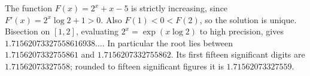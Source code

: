 The function $F(x)=2^x+x-5$ is strictly increasing, since $F'(x)=2^x\log2+1>0$. Also $F(1)<0<F(2)$, so the solution is unique. Bisection on $[1,2]$, evaluating $2^x=\exp(x\log2)$ to high precision, gives $1.71562073327558616938\ldots$. In particular the root lies between $1.7156207332755861$ and $1.7156207332755862$. Its first fifteen significant digits are $\boxed{1.71562073327558}$; rounded to fifteen significant figures it is $1.71562073327559$.
